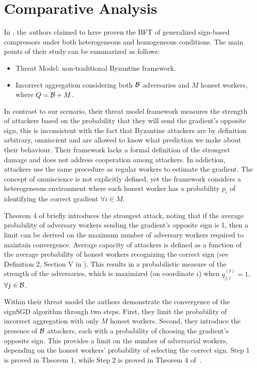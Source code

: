 \section{Comparative Analysis}
\label{sec:comparative}

In \cite{jin2024sign}, the authors claimed to have proven the BFT of generalized sign-based compressors under both heterogeneous and homogeneous conditions. The main points of their study can be summarized as follows:

\begin{itemize}
    \item Threat Model: non-traditional Byzantine framework. 
    \item Incorrect aggregation considering both $\mathcal B$ adversaries and $M$ honest workers, where $Q = \mathcal B + M$.
\end{itemize}

In contrast to our scenario, their threat model framework measures the strength of attackers based on the probability that they will send the gradient’s opposite sign, this is inconsistent with the fact that Byzantine attackers are by definition arbitrary, omniscient and are allowed to know what prediction we make about their behaviour. Their framework lacks a formal definition of the strongest damage and does not address cooperation among attackers. In addiction, attackers use the same procedure as regular workers to estimate the gradient. The concept of omniscience is not explicitly defined, yet the framework considers a heterogeneous environment where each honest worker has a probability \( p_i \) of identifying the correct gradient $ \forall i \in M$.

Theorem 4 of \cite{jin2024sign} briefly introduces the strongest attack, noting that if the average probability of adversary workers sending the gradient's opposite sign is 1, then a limit can be derived on the maximum number of adversary workers required to maintain convergence. Average capacity of attackers is defined as a function of the average probability of honest workers recognizing the correct sign (see Definition 2, Section V in \cite{jin2024sign}).
This results in a probabilistic measure of the strength of the adversaries, which is maximized (on coordinate $i$) when \( q_{j,i}^{(t)} = 1 \), $\forall j \in \mathcal B$.

Within their threat model the authors demonstrate the convergence of the signSGD algorithm through two steps. First, they limit the probability of incorrect aggregation with only \( M \) honest workers. Second, they introduce the presence of \( \mathcal B \) attackers, each with a probability of choosing the gradient's opposite sign. This provides a limit on the number of adversarial workers, depending on the honest workers’ probability of selecting the correct sign. Step 1 is proved in Theorem 1, while Step 2 is proved in Theorem 4 of~\cite{jin2024sign}.


